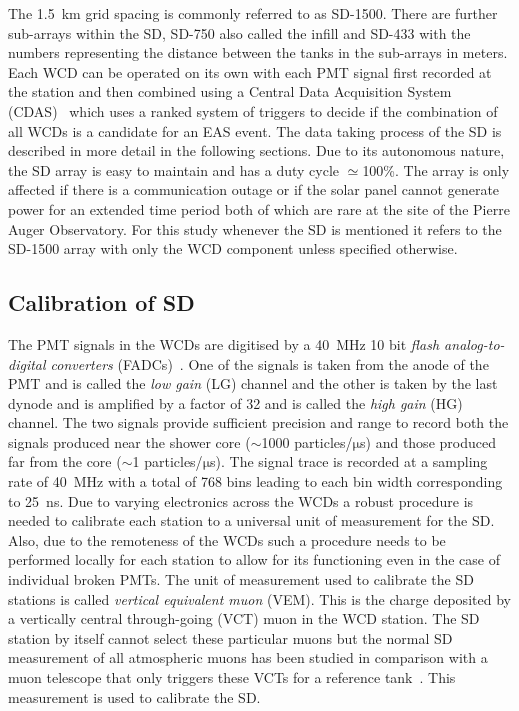 The 1.5 km grid spacing is commonly referred to as SD-1500. There are further sub-arrays within the SD, SD-750 also called the infill and SD-433 with the numbers representing the distance between the tanks in the sub-arrays in meters. Each WCD can be operated on its own with each PMT signal first recorded at the station and then combined using a Central Data Acquisition System (CDAS)~\cite{Auger:2015} which uses a ranked system of triggers to decide if the combination of all WCDs is a candidate for an EAS event. The data taking process of the SD is described in more detail in the following sections. Due to its autonomous nature, the SD array is easy to maintain and has a duty cycle $\simeq$100\%. The array is only affected if there is a communication outage or if the solar panel cannot generate power for an extended time period both of which are rare at the site of the Pierre Auger Observatory. For this study whenever the SD is mentioned it refers to the SD-1500 array with only the WCD component unless specified otherwise.     

\subsection{Calibration of SD}
\label{sec:Sur_det_calib}

The PMT signals in the WCDs are digitised by a 40 MHz 10 bit \textit{flash analog-to-digital converters} (FADCs)~\cite{PierreAuger:2005znw}. One of the signals is taken from the anode of the PMT and is called the \textit{low gain} (LG) channel and the other is taken by the last dynode and is amplified by a factor of 32 and is called the \textit{high gain} (HG) channel. The two signals provide sufficient precision and range to record both the signals produced near the shower core ($\sim$1000 particles/$\mathrm{\mu}$s) and those produced far from the core ($\sim$1 particles/$\mathrm{\mu}$s). The signal trace is recorded at a sampling rate of 40 MHz with a total of 768 bins leading to each bin width corresponding to 25 ns. Due to varying electronics across the WCDs a robust procedure is needed to calibrate each station to a universal unit of measurement for the SD. Also, due to the remoteness of the WCDs such a procedure needs to be performed locally for each station to allow for its functioning even in the case of individual broken PMTs. The unit of measurement used to calibrate the SD stations is called \textit{vertical equivalent muon} (VEM). This is the charge deposited by a vertically central through-going (VCT) muon in the WCD station. The SD station by itself cannot select these particular muons but the normal SD measurement of all atmospheric muons has been studied in comparison with a muon telescope that only triggers these VCTs for a reference tank~\cite{PierreAuger:2005cju}. This measurement is used to calibrate the SD.

